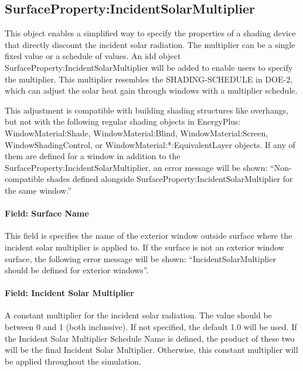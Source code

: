 \subsection{SurfaceProperty:IncidentSolarMultiplier}

This object enables a simplified way to specify the properties of a shading
device that directly discount the incident solar radiation. The multiplier can
be a single fixed value or a schedule of values. An idd object
SurfaceProperty:IncidentSolarMultiplier will be added to enable users to specify
the multiplier. This multiplier resembles the SHADING-SCHEDULE in DOE-2, which
can adjust the solar heat gain through windows with a multiplier schedule.

This adjustment is compatible with building shading structures like overhangs,
but not with the following regular shading objects in EnergyPlus:
WindowMaterial:Shade, WindowMaterial:Blind, WindowMaterial:Screen,
WindowShadingControl, or WindowMaterial:*:EquivalentLayer objects. If any of
them are defined for a window in addition to the
SurfaceProperty:IncidentSolarMultiplier, an error message will be shown:
``Non-compatible shades defined alongside SurfaceProperty:IncidentSolarMultiplier
for the same window.''

\paragraph{Field: Surface Name}\label{field-surface-name-IncidentSolarMultiplier}

This field is specifies the name of the exterior window outside surface where
the incident solar multiplier is applied to. If the surface is not an exterior
window surface, the following error message will be shown:
``IncidentSolarMultiplier should be defined for exterior windows''.

\paragraph{Field: Incident Solar Multiplier}\label{field-shading-multiplier-IncidentSolarMultiplier}

A constant multiplier for the incident solar radiation. The value should be
between 0 and 1 (both inclussive). If not specified, the default 1.0 will be
used. If the Incident Solar Multiplier Schedule Name is defined, the product of
these two will be the final Incident Solar Multiplier. Otherwise, this constant
multiplier will be applied throughout the simulation.

